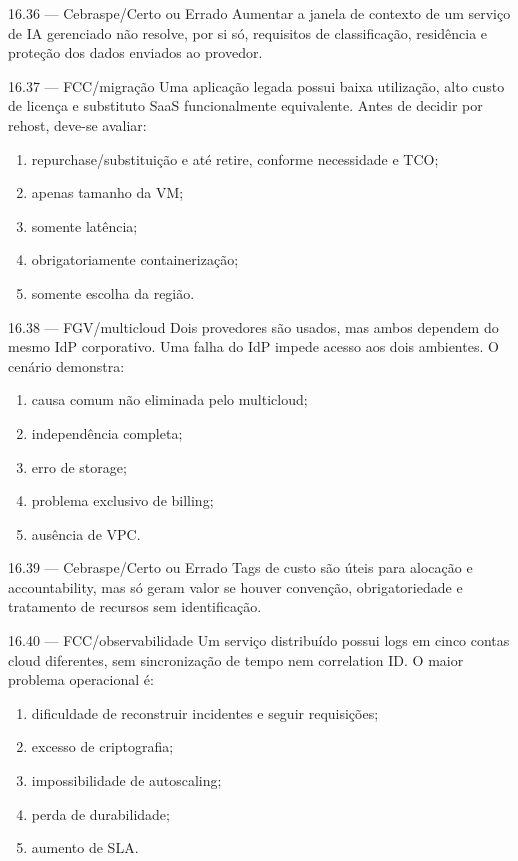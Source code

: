 \begin{questao}{ 16.36 — Cebraspe/Certo ou Errado}
Aumentar a janela de contexto de um serviço de IA gerenciado não resolve, por si só, requisitos de classificação, residência e proteção dos dados enviados ao provedor.
\end{questao}

\begin{questao}{ 16.37 — FCC/migração}
Uma aplicação legada possui baixa utilização, alto custo de licença e substituto SaaS funcionalmente equivalente. Antes de decidir por rehost, deve-se avaliar:
\begin{enumerate}[label=\Alph*)]
\item repurchase/substituição e até retire, conforme necessidade e TCO;
\item apenas tamanho da VM;
\item somente latência;
\item obrigatoriamente containerização;
\item somente escolha da região.
\end{enumerate}
\end{questao}

\begin{questao}{ 16.38 — FGV/multicloud}
Dois provedores são usados, mas ambos dependem do mesmo IdP corporativo. Uma falha do IdP impede acesso aos dois ambientes. O cenário demonstra:
\begin{enumerate}[label=\Alph*)]
\item causa comum não eliminada pelo multicloud;
\item independência completa;
\item erro de storage;
\item problema exclusivo de billing;
\item ausência de VPC.
\end{enumerate}
\end{questao}

\begin{questao}{ 16.39 — Cebraspe/Certo ou Errado}
Tags de custo são úteis para alocação e accountability, mas só geram valor se houver convenção, obrigatoriedade e tratamento de recursos sem identificação.
\end{questao}

\begin{questao}{ 16.40 — FCC/observabilidade}
Um serviço distribuído possui logs em cinco contas cloud diferentes, sem sincronização de tempo nem correlation ID. O maior problema operacional é:
\begin{enumerate}[label=\Alph*)]
\item dificuldade de reconstruir incidentes e seguir requisições;
\item excesso de criptografia;
\item impossibilidade de autoscaling;
\item perda de durabilidade;
\item aumento de SLA.
\end{enumerate}
\end{questao}

